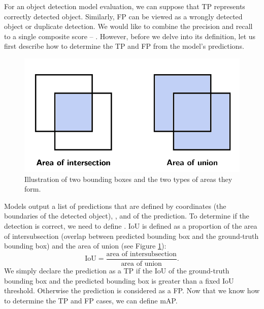 For an object detection model evaluation, we can suppose that TP represents correctly detected object. Similarly, FP can be viewed as a wrongly detected object or duplicate detection. We would like to combine the precision and recall to a single composite score -- . However, before we delve into its definition, let us first describe how to determine the TP and FP from the model's predictions.

\begin{figure}[H]
    \centering
    \includegraphics[width=0.6\linewidth]{Sources/Figures/iou.png}
    \caption{Illustration of two bounding boxes and the two types of areas they form.}
    \label{fig:iou}
\end{figure}

Models output a list of predictions that are defined by  coordinates (the boundaries of the detected object), , and  of the prediction. To determine if the detection is correct, we need to define . IoU is defined as a proportion of the area of intersubsection (overlap between predicted bounding box and the ground-truth bounding box) and the area of union (see Figure \ref{fig:iou}):
$$
    \text{IoU} = \frac{\text{area of intersubsection}}{\text{area of union}}.
$$
We simply declare the prediction as a TP if the IoU of the ground-truth bounding box and the predicted bounding box is greater than a fixed IoU threshold. Otherwise the prediction is considered as a FP. Now that we know how to determine the TP and FP cases, we can define mAP.

